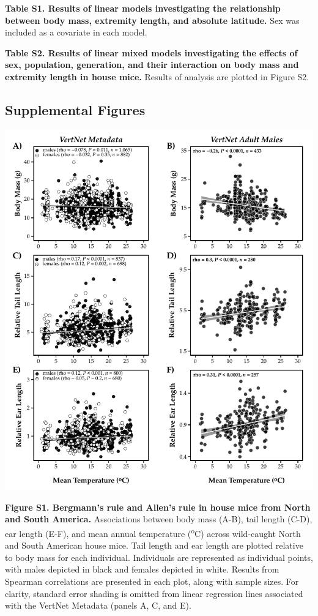 \documentclass[
]{article}
\begin{document}
\textbf{Table S1. Results of linear models investigating the
relationship between body mass, extremity length, and absolute
latitude.} Sex was included as a covariate in each model.

\newpage

\textbf{Table S2. Results of linear mixed models investigating the
effects of sex, population, generation, and their interaction on body
mass and extremity length in house mice.} Results of analysis are
plotted in Figure S2.

\newpage

\hypertarget{supplemental-figures}{%
\subsection{Supplemental Figures}\label{supplemental-figures}}

\includegraphics{../results/figures/VertNet_meantemp.pdf}

\textbf{Figure S1. Bergmann's rule and Allen's rule in house mice from
North and South America.} Associations between body mass (A-B), tail
length (C-D), ear length (E-F), and mean annual temperature
(\textsuperscript{o}C) across wild-caught North and South American house
mice. Tail length and ear length are plotted relative to body mass for
each individual. Individuals are represented as individual points, with
males depicted in black and females depicted in white. Results from
Spearman correlations are presented in each plot, along with sample
sizes. For clarity, standard error shading is omitted from linear
regression lines associated with the VertNet Metadata (panels A, C, and
E).
\end{document}
